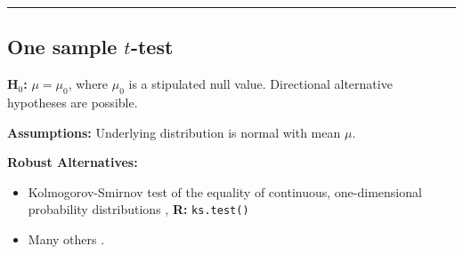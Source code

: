 \documentclass[12pt,english]{article}\usepackage[]{graphicx}\usepackage[table]{xcolor}
\begin{document}
\par\noindent\rule{.9\textwidth}{0.4pt}


\subsection{One sample $t$-test}

\noindent \textbf{H$_0$:} $\mu = \mu_0$, where $\mu_0$ is a stipulated null value. Directional alternative hypotheses are possible.

\vspace{0.1in}
\noindent \textbf{Assumptions:} Underlying distribution is normal with mean $\mu$.
\vspace{0.1in}

\noindent \textbf{Robust Alternatives:}
\begin{small}
\begin{itemize}
\item Kolmogorov-Smirnov test of the equality of continuous, one-dimensional probability distributions \citep{kolmogorov1933, smirnov1948}, \textbf{R:} \texttt{ks.test()}\vspace{-.1in}
\item Many others \citep[see][]{wilcox2012, hollander2013}.
\end{itemize}
\end{small}
\end{document}
